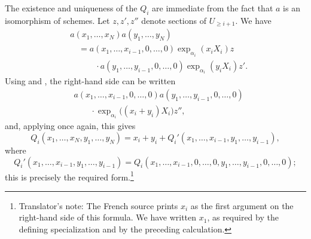 The existence and uniqueness of the \(Q_i\) are immediate from
the fact that \(a\) is an isomorphism of schemes. Let
\(z,z',z''\) denote sections of \(U_{\geq i+1}\). We have
\[
\begin{split}
  &a(x_1,\ldots,x_N)a(y_1,\ldots,y_N)\\
  &\quad =
  a(x_1,\ldots,x_{i-1},0,\ldots,0)
  \exp_{\alpha_i}(x_iX_i)z\\
  &\qquad\quad{}\cdot
  a(y_1,\ldots,y_{i-1},0,\ldots,0)
  \exp_{\alpha_i}(y_iX_i)z'.
\end{split}
\]
Using  \textup{} and \textup{}, the right-hand side
can be written
\[
\begin{split}
  &a(x_1,\ldots,x_{i-1},0,\ldots,0)
  a(y_1,\ldots,y_{i-1},0,\ldots,0)\\
  &\qquad{}\cdot
  \exp_{\alpha_i}\bigl((x_i+y_i)X_i\bigr)z'',
\end{split}
\]
and, applying  once again, this gives
\[
  Q_i(x_1,\ldots,x_N,y_1,\ldots,y_N)
  =
  x_i+y_i+
  Q_i'(x_1,\ldots,x_{i-1},y_1,\ldots,y_{i-1}),
\]
where
\[
  Q_i'(x_1,\ldots,x_{i-1},y_1,\ldots,y_{i-1})
  =
  Q_i(x_1,\ldots,x_{i-1},0,\ldots,0,
      y_1,\ldots,y_{i-1},0,\ldots,0);
\]
this is precisely the required form.\footnote{Translator's note: The
French source prints \(x_i\) as the first argument on the right-hand
side of this formula. We have written \(x_1\), as required by the
defining specialization and by the preceding calculation.}

